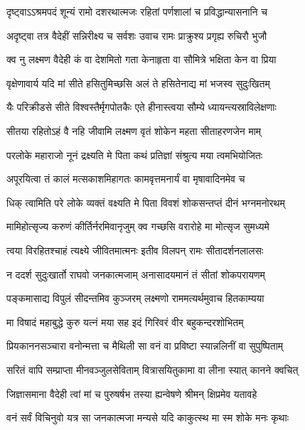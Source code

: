 
\twolineshloka
{दृष्ट्वाऽऽश्रमपदं शून्यं रामो दशरथात्मजः}
{रहितां पर्णशालां च प्रविद्धान्यासनानि च} %

\twolineshloka
{अदृष्ट्वा तत्र वैदेहीं सन्निरीक्ष्य च सर्वशः}
{उवाच रामः प्राक्रुश्य प्रगृह्य रुचिरौ भुजौ} %

\twolineshloka
{क्व नु लक्ष्मण वैदेही कं वा देशमितो गता}
{केनाहृता वा सौमित्रे भक्षिता केन वा प्रिया} %

\twolineshloka
{वृक्षेणावार्य यदि मां सीते हसितुमिच्छसि}
{अलं ते हसितेनाद्य मां भजस्व सुदुःखितम्} %

\twolineshloka
{यैः परिक्रीडसे सीते विश्वस्तैर्मृगपोतकैः}
{एते हीनास्त्वया सौम्ये ध्यायन्त्यस्राविलेक्षणाः} %

\twolineshloka
{सीतया रहितोऽहं वै नहि जीवामि लक्ष्मण}
{वृतं शोकेन महता सीताहरणजेन माम्} %

\twolineshloka
{परलोके महाराजो नूनं द्रक्ष्यति मे पिता}
{कथं प्रतिज्ञां संश्रुत्य मया त्वमभियोजितः} %

\twolineshloka
{अपूरयित्वा तं कालं मत्सकाशमिहागतः}
{कामवृत्तमनार्यं वा मृषावादिनमेव च} %

\twolineshloka
{धिक् त्वामिति परे लोके व्यक्तं वक्ष्यति मे पिता}
{विवशं शोकसन्तप्तं दीनं भग्नमनोरथम्} %

\twolineshloka
{मामिहोत्सृज्य करुणं कीर्तिर्नरमिवानृजुम्}
{क्व गच्छसि वरारोहे मा मोत्सृज सुमध्यमे} %

\twolineshloka
{त्वया विरहितश्चाहं त्यक्ष्ये जीवितमात्मनः}
{इतीव विलपन् रामः सीतादर्शनलालसः} %

\twolineshloka
{न ददर्श सुदुःखार्तो राघवो जनकात्मजाम्}
{अनासादयमानं तं सीतां शोकपरायणम्} %

\twolineshloka
{पङ्कमासाद्य विपुलं सीदन्तमिव कुञ्जरम्}
{लक्ष्मणो राममत्यर्थमुवाच हितकाम्यया} %

\twolineshloka
{मा विषादं महाबुद्धे कुरु यत्नं मया सह}
{इदं गिरिवरं वीर बहुकन्दरशोभितम्} %

\twolineshloka
{प्रियकाननसञ्चारा वनोन्मत्ता च मैथिली}
{सा वनं वा प्रविष्टा स्यान्नलिनीं वा सुपुष्पिताम्} %

\twolineshloka
{सरितं वापि सम्प्राप्ता मीनवञ्जुलसेविताम्}
{वित्रासयितुकामा वा लीना स्यात् कानने क्वचित्} %

\twolineshloka
{जिज्ञासमाना वैदेही त्वां मां च पुरुषर्षभ}
{तस्या ह्यन्वेषणे श्रीमन् क्षिप्रमेव यतावहे} %

\twolineshloka
{वनं सर्वं विचिनुवो यत्र सा जनकात्मजा}
{मन्यसे यदि काकुत्स्थ मा स्म शोके मनः कृथाः} %

